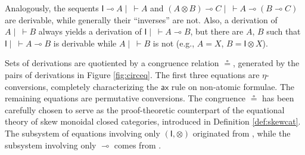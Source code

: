 \documentclass[copyright,creativecommons]{eptcs}
\theoremstyle{definition}
\newcommand{\tl}{\otimes \mathsf{L}}
\newcommand{\ax}{\mathsf{ax}}
\newcommand{\ot}{\otimes}
\newcommand{\lolli}{\multimap}
\newcommand{\I}{\mathsf{I}}
\begin{document}
Analogously, the sequents $\I \lolli A \mid ~ \vdash A$ and $(A \ot B) \lolli C \mid ~ \vdash A \lolli (B \lolli C)$ are derivable, while generally their ``inverses'' are not. Also, a derivation of $A \mid ~ \vdash B$ always yields a derivation of $\I \mid ~ \vdash A \lolli B$, but there are $A$, $B$ such that $\I \mid ~ \vdash A \lolli B$ is derivable while  $A \mid ~ \vdash B$ is not (e.g., $A = X$, $B = \I \ot X$).

Sets of derivations are quotiented by a congruence relation $\circeq$, generated by the pairs of derivations in Figure \ref{fig:circeq}. The first three equations are $\eta$-conversions, completely characterizing the $\ax$ rule on non-atomic formulae. The remaining equations are permutative conversions. The congruence $\circeq$ has been carefully chosen to serve as the proof-theoretic counterpart of the equational theory of skew monoidal closed categories, introduced in Definition \ref{def:skewcat}. The subsystem of equations involving only $(\I,\ot)$ originated from \cite{uustalu:sequent:2021}, while the subsystem involving only $\lolli$ comes from \cite{uustalu:deductive:nodate}.
\end{document}
